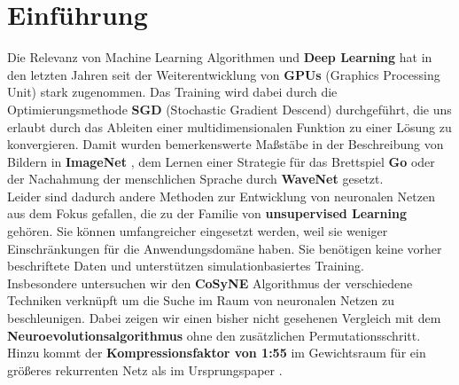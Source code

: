 \chapter{Einführung}


Die Relevanz von Machine Learning Algorithmen und \textbf{Deep Learning} \cite{dloverview} hat in den letzten Jahren seit der Weiterentwicklung von \textbf{GPUs} (Graphics Processing Unit) stark zugenommen. Das Training wird dabei durch die Optimierungsmethode \textbf{SGD} (Stochastic Gradient Descend) durchgeführt, die uns erlaubt durch das Ableiten einer multidimensionalen Funktion zu einer Lösung zu konvergieren. Damit wurden bemerkenswerte Maßstäbe in der Beschreibung von Bildern in \textbf{ImageNet} \cite{NIPS2012_4824}, dem Lernen einer Strategie für das Brettspiel \textbf{Go} \cite{go} oder der Nachahmung der menschlichen Sprache durch \textbf{WaveNet} \cite{wavenet} gesetzt. \\

\noindent
Leider sind dadurch andere Methoden zur Entwicklung von neuronalen Netzen aus dem Fokus gefallen, die zu der Familie von \textbf{unsupervised Learning} gehören. Sie können umfangreicher eingesetzt werden, weil sie weniger Einschränkungen für die Anwendungsdomäne haben. Sie benötigen keine vorher beschriftete Daten und unterstützen simulationbasiertes Training. \\

\noindent
Insbesondere untersuchen wir den \textbf{CoSyNE} Algorithmus der verschiedene Techniken verknüpft um die Suche im Raum von neuronalen Netzen zu beschleunigen. Dabei zeigen wir einen bisher nicht gesehenen Vergleich mit dem \textbf{Neuroevolutionsalgorithmus} ohne den zusätzlichen Permutationsschritt. Hinzu kommt der \textbf{Kompressionsfaktor von 1:55} im Gewichtsraum für ein größeres rekurrenten Netz als im Ursprungspaper \cite{cosyne1}.


